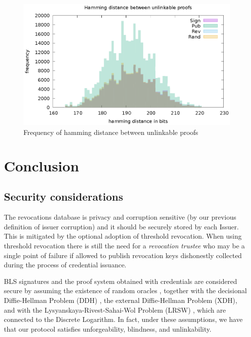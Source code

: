 \begin{figure}
    \centering
    \includegraphics[width=1\linewidth]{hamming.eps}

    \caption{Frequency of hamming distance between unlinkable proofs}
    \label{fig:hamming}
\end{figure}


\section{Conclusion}
\subsection{Security considerations}

The revocations database is privacy and corruption sensitive (by our previous definition of issuer corruption) and it should be securely stored by each Issuer. This is mitigated by the optional adoption of threshold revocation. When using threshold revocation there is still the need for a \textit{revocation trustee} who may be a single point of failure if allowed to publish revocation keys dishonestly collected during the process of credential issuance.

BLS signatures and the proof system obtained with credentials are
considered secure by assuming the existence of random oracles
\cite{random-oracle}, together with the decisional Diffie-Hellman
Problem (DDH) \cite{DDH-problem}, the external Diffie-Hellman Problem
(XDH), and with the Lysyanskaya-Rivest-Sahai-Wol Problem (LRSW)
\cite{lrsw-assumption}, which are connected to the Discrete
Logarithm. In fact, under these assumptions, we have that our protocol
satisfies unforgeability, blindness, and unlinkability.


